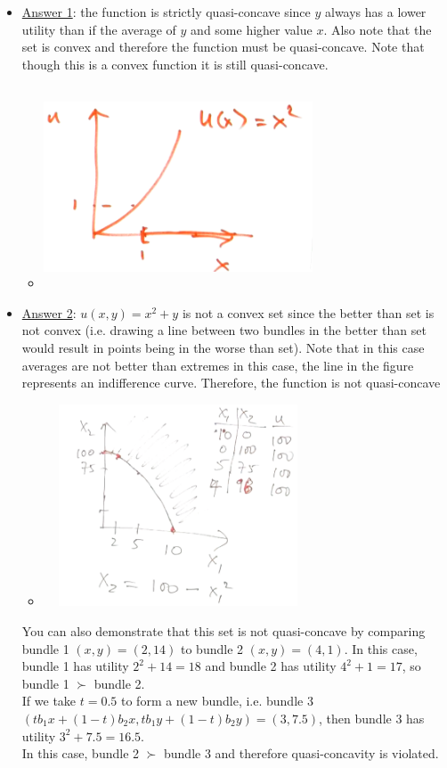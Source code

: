 \documentclass{article}
\begin{document}
  \begin{itemize}
    \item  \underline{Answer 1}: the function is strictly quasi-concave since $y$ always has a lower utility than if the average of $y$ and some higher value $x$. Also note that the set is convex and therefore the function must be quasi-concave. Note that though this is a convex function it is still quasi-concave.
    \begin{itemize}
      \item  \includegraphics[width=8cm, height=6cm]{pic19}
    \end{itemize}
    \item  \underline{Answer 2}: $u(x,y) = x^{2} + y$ is not a convex set since the better than set is not convex (i.e. drawing a line between two bundles in the better than set would result in points being in the worse than set). Note that in this case averages are not better than extremes in this case, the line in the figure represents an indifference curve. Therefore, the function is not quasi-concave
    \begin{itemize}
      \item  \includegraphics[width=8cm, height=6cm]{pic18}
    \end{itemize}
    You can also demonstrate that this set is not quasi-concave by comparing bundle 1 $(x,y) = (2, 14)$ to bundle 2 $(x,y) = (4, 1)$. In this case, bundle 1 has utility $2^{2} + 14 = 18$ and bundle 2 has utility $4^2 + 1 = 17$, so bundle 1 $\succ$ bundle 2. \\ If we take $t=0.5$ to form a new bundle, i.e. bundle 3 $(tb_{1}x + (1-t)b_{2}x, tb_{1}y + (1-t)b_{2}y) = (3, 7.5)$, then bundle 3 has utility $3^{2} + 7.5 = 16.5$. \\ In this case, bundle 2 $\succ$ bundle 3 and therefore quasi-concavity is violated.
  \end{itemize}
  \par
\vspace{6mm}
\end{document}
